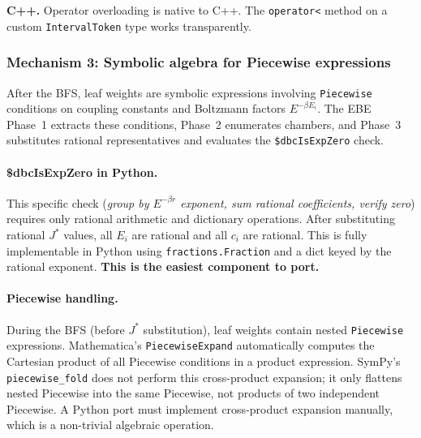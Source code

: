 \documentclass[12pt,a4paper]{article}
\theoremstyle{critical}
\theoremstyle{remark}
\theoremstyle{verified}
\begin{document}
\textbf{C++.}  Operator overloading is native to C++.  The \texttt{operator<}
method on a custom \texttt{IntervalToken} type works transparently.

\subsubsection{Mechanism 3: Symbolic algebra for Piecewise expressions}

After the BFS, leaf weights are symbolic expressions involving
\texttt{Piecewise} conditions on coupling constants and Boltzmann factors
$E^{-\beta E_i}$.  The EBE Phase~1 extracts these conditions, Phase~2 enumerates
chambers, and Phase~3 substitutes rational representatives and evaluates the
\texttt{\$dbcIsExpZero} check.

\paragraph{\$dbcIsExpZero in Python.}  This specific check (\emph{group by
$E^{-\beta r}$ exponent, sum rational coefficients, verify zero}) requires only
rational arithmetic and dictionary operations.  After substituting rational $J^\ast$
values, all $E_i$ are rational and all $c_i$ are rational.  This is fully
implementable in Python using \texttt{fractions.Fraction} and a dict keyed by
the rational exponent.  \textbf{This is the easiest component to port.}

\paragraph{Piecewise handling.}  During the BFS (before $J^\ast$ substitution),
leaf weights contain nested \texttt{Piecewise} expressions.  Mathematica's
\texttt{PiecewiseExpand} automatically computes the Cartesian product of all
Piecewise conditions in a product expression.  SymPy's
\texttt{piecewise\_fold} does not perform this cross-product expansion; it only
flattens nested Piecewise into the same Piecewise, not products of two
independent Piecewise.  A Python port must implement cross-product expansion
manually, which is a non-trivial algebraic operation.
\end{document}
